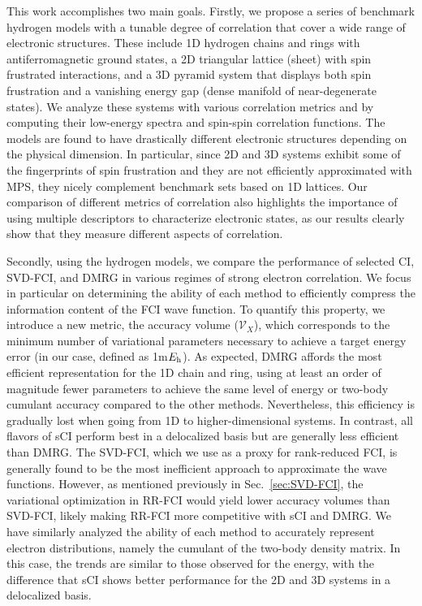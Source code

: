 \documentclass[aip,jcp,amsmath,amssymb, reprint]{revtex4-1}
\newcommand*{\Eh}{$E_{\rm h}$\xspace}
\newcommand*{\ncomp}{\mathcal{V}_X}
\begin{document}
This work accomplishes two main goals.
Firstly, we propose a series of benchmark hydrogen models with a tunable degree of correlation that cover a wide range of electronic structures.
These include 1D hydrogen chains and rings with antiferromagnetic ground states, a 2D triangular lattice (sheet)  with spin frustrated interactions, and a 3D pyramid system that displays both spin frustration and a vanishing energy gap (dense manifold of near-degenerate states).
We analyze these systems with various correlation metrics and by computing their low-energy spectra and spin-spin correlation functions.
The models are found to have drastically different electronic structures depending on the physical dimension. 
In particular, since 2D and 3D systems exhibit some of the fingerprints of spin frustration and they are not efficiently approximated with MPS, they nicely complement benchmark sets based on 1D lattices.
Our comparison of different metrics of correlation also highlights the importance of using multiple descriptors to characterize electronic states, as our results clearly show that they measure different aspects of correlation.

Secondly, using the hydrogen models, we compare the performance of selected CI, SVD-FCI, and DMRG in various regimes of strong electron correlation.
We focus in particular on determining the ability of each method to efficiently compress the information content of the FCI wave function.
To quantify this property, we introduce a new metric, the accuracy volume ($\ncomp$), which corresponds to the minimum number of variational parameters necessary to achieve a target energy error (in our case, defined as 1m\Eh).
As expected, DMRG affords the most efficient representation for the 1D  chain and ring, using at least an order of magnitude fewer parameters to achieve the same level of energy or two-body cumulant accuracy compared to the other methods.
Nevertheless, this efficiency is gradually lost when going from 1D to higher-dimensional systems.
In contrast, all flavors of sCI perform best in a delocalized basis but are generally less efficient than DMRG.
The SVD-FCI, which we use as a proxy for rank-reduced FCI, is generally found to be the most inefficient approach to approximate the  wave functions.
However, as mentioned previously in Sec.~\ref{sec:SVD-FCI}, the variational optimization in RR-FCI would yield lower accuracy volumes than SVD-FCI, likely making RR-FCI more competitive with sCI and DMRG.
We have similarly analyzed the ability of each method to accurately represent electron distributions, namely the cumulant of the two-body density matrix.
In this case, the trends are similar to those observed for the energy, with the difference that sCI shows better performance for the 2D and 3D systems in a delocalized basis.
\end{document}
